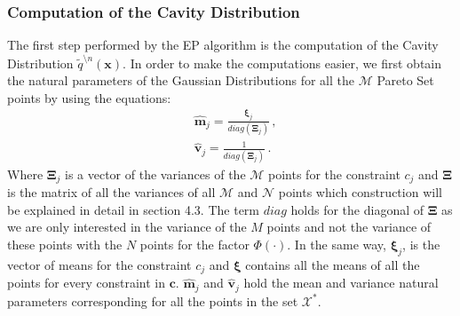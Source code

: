 \documentclass[review,preprint,12pt]{elsarticle}
\begin{document}
\subsubsection{Computation of the Cavity Distribution}

The first step performed by the EP algorithm is the computation of the Cavity Distribution $\tilde{q}^{\setminus n}(\boldsymbol{x})$. In order to make the computations easier, we first obtain the natural parameters of the Gaussian Distributions for all the $\mathcal{M}$ Pareto Set points by using the equations:
\begin{align}
& \boldsymbol{\hat{m}}_{j} = \frac{\boldsymbol{\xi}_j}{diag(\boldsymbol{\Xi}_j)}\,, \nonumber \\
& \boldsymbol{\hat{v}}_{j} = \frac{1}{diag(\boldsymbol{\Xi}_j)}\,.
\end{align}
Where $\boldsymbol{\Xi}_j$ is a vector of the variances of the $\mathcal{M}$ points for the constraint $c_j$ and $\boldsymbol{\Xi}$ is the matrix of all the variances of all $\mathcal{M}$ and $\mathcal{N}$ points which construction will be explained in detail in section 4.3. The term $diag$ holds for the diagonal of $\boldsymbol{\Xi}$ as we are only interested in the variance of the $M$ points and not the variance of these points with the $N$ points for the factor $\Phi(\cdot)$. In the same way, $\boldsymbol{\xi}_j$, is the vector of means for the constraint $c_j$ and $\boldsymbol{\xi}$ contains all the means of all the points for every constraint in $\boldsymbol{c}$. $\boldsymbol{\hat{m}}_{j}$ and $\boldsymbol{\hat{v}}_{j}$ hold the mean and variance natural parameters corresponding for all the points in the set $\mathcal{X}^*$.
\end{document}
